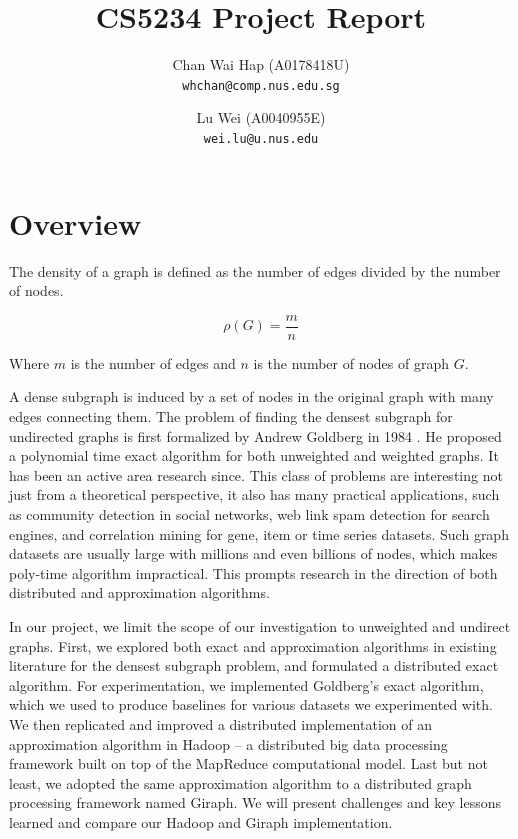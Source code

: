 \documentclass{article}
\title{CS5234 Project Report}
\author{
  Chan Wai Hap (A0178418U) \\
  \texttt{whchan@comp.nus.edu.sg}
  \and
  Lu Wei (A0040955E) \\
  \texttt{wei.lu@u.nus.edu}
}
\begin{document}
\maketitle

\tableofcontents

\pagebreak

\section{Overview}
The density of a graph is defined as the number of edges divided by the number of nodes.

\begin{equation}
  \rho(G) = \frac{m}{n}
\end{equation}

Where $m$ is the number of edges and $n$ is the number of nodes of graph $G$.

A dense subgraph is induced by a set of nodes in the original graph with many edges connecting them. The problem of finding the densest subgraph for undirected graphs is first formalized by Andrew Goldberg in 1984 \cite{Goldberg:CSD-84-171}. He proposed a polynomial time exact algorithm for both unweighted and weighted graphs. It has been an active area research since. This class of problems are interesting not just from a theoretical perspective, it also has many practical applications, such as community detection in social networks, web link spam detection for search engines, and correlation mining for gene, item or time series datasets. Such graph datasets are usually large with millions and even billions of nodes, which makes poly-time algorithm impractical. This prompts research in the direction of both distributed and approximation algorithms.

In our project, we limit the scope of our investigation to unweighted and undirect graphs. First, we explored both exact and approximation algorithms in existing literature for the densest subgraph problem, and formulated a distributed exact algorithm. For experimentation, we implemented Goldberg's exact algorithm, which we used to produce baselines for various datasets we experimented with. We then replicated and improved a distributed implementation of an approximation algorithm in Hadoop – a distributed big data processing framework built on top of the MapReduce computational model. Last but not least, we adopted the same approximation algorithm to a distributed graph processing framework named Giraph. We will present challenges and key lessons learned and compare our Hadoop and Giraph implementation.
\end{document}

